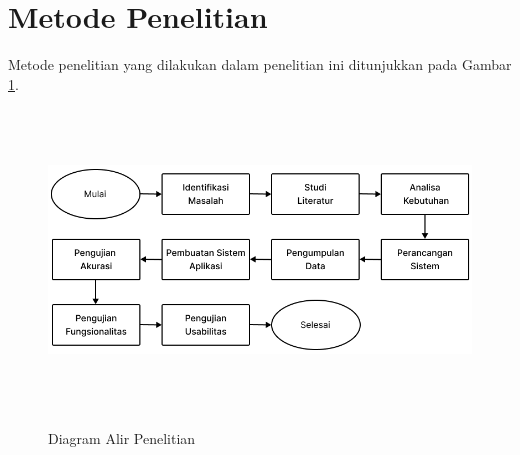 \fancyhf{} 
\fancyfoot[R]{\thepage}

\begin{figure}[H]
\end{figure}

\fancyhf{} 
\fancyfoot[R]{\thepage}

\section{Metode Penelitian}
Metode penelitian yang dilakukan dalam penelitian ini ditunjukkan pada Gambar \ref{img:diagram_alir_penelitian}.

\begin{figure}[H]
\centering
{\includegraphics [width = 14cm, height= 8cm]{gambar/bab3/diagram_alir}}
\caption{Diagram Alir Penelitian}
\label{img:diagram_alir_penelitian}
\end{figure}

\fancyhf{} 
\fancyfoot[R]{\thepage}

